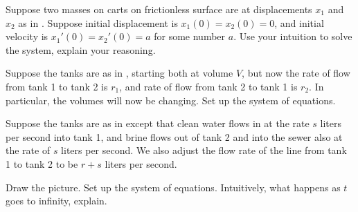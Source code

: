 \documentclass{ximera}
\begin{document}
\begin{exercise}%
    Suppose two masses on carts on frictionless surface are at  displacements $x_1$ and $x_2$ as in . Suppose initial displacement is $x_1(0)=x_2(0)=0$, and initial velocity is $x_1'(0) = x_2'(0) = a$ for some number $a$. Use your intuition to solve the system, explain your reasoning.
\end{exercise}

\begin{exercise}
    Suppose the tanks are as in , starting both at volume $V$, but now the rate of flow from tank 1 to tank 2 is $r_1$, and rate of flow from tank 2 to tank 1 is $r_2$.  In particular, the volumes will now be changing.  Set up the system of equations.
\end{exercise}

\begin{exercise}%
    Suppose the tanks are as in   except that clean water flows in at the rate $s$ liters per second into tank 1, and brine flows out of tank 2 and into the sewer also at the rate of $s$ liters per second. We also adjust the flow rate of the line from tank 1 to tank 2 to be $r+s$ liters per second.
    \begin{tasks}
        \task Draw the picture.
        \task Set up the system of equations.
        \task Intuitively, what happens as $t$ goes to infinity, explain.
    \end{tasks}
\end{exercise}
\end{document}
